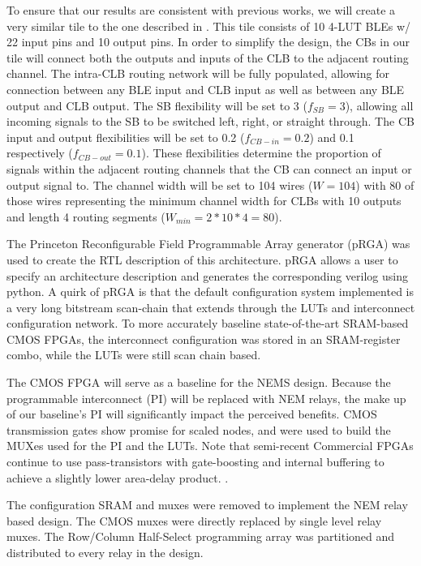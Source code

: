 \documentclass[twoside,twocolumn]{article}
\begin{document}
To ensure that our results are consistent with previous works, we
will create a very similar tile to the one described in \cite{chen_efficient_2010}. 
This tile consists of 10 4-LUT BLEs w/ 22 input pins and 10 output pins.
In order to simplify the design, the CBs in our tile will connect both
the outputs and inputs of the CLB to the adjacent routing channel.
The intra-CLB routing network will be fully populated, allowing for connection 
between any BLE input and CLB input as well as between any BLE output and CLB output.
The SB flexibility will be set to 3 ($f_{SB} = 3$), allowing all 
incoming signals to the SB to be switched left, right, or straight through. 
The CB input and output flexibilities will be set to 0.2 ($f_{CB-in} = 0.2$) 
and 0.1 respectively ($f_{CB-out} = 0.1$). These flexibilities determine the 
proportion of signals within the adjacent routing channels that the CB can 
connect an input or output signal to. The channel width will be set to 104 wires
($W=104$) with 80 of those wires representing the minimum channel width for 
CLBs with 10 outputs and length 4 routing segments ($W_{min} = 2 * 10 * 4 = 80$).


The Princeton Reconfigurable Field Programmable Array generator (pRGA) 
was used to create the RTL description of this architecture.
pRGA allows a user to specify an architecture description and 
generates the corresponding verilog using python. A quirk of 
pRGA is that the default configuration system implemented is 
a very long bitstream scan-chain that extends through the LUTs 
and interconnect configuration network. To more accurately baseline 
state-of-the-art SRAM-based CMOS FPGAs, the interconnect configuration 
was stored in an SRAM-register combo, while the LUTs were still scan chain based.

The CMOS FPGA will serve as a baseline for the NEMS design.
Because the programmable interconnect (PI) will be replaced with NEM relays, the make up
of our baseline's PI will significantly impact the perceived benefits. 
CMOS transmission gates show promise for scaled nodes, and were used to build the MUXes used 
for the PI and the LUTs. Note that semi-recent Commercial FPGAs continue to use pass-transistors with gate-boosting and internal buffering
to achieve a slightly lower area-delay product. \cite{chiasson_should_2013}.

The configuration SRAM and muxes were removed to implement the NEM relay based design. 
The CMOS muxes were directly replaced by single level relay muxes. The Row/Column Half-Select programming 
array was partitioned and distributed to every relay in the design.
\end{document}
